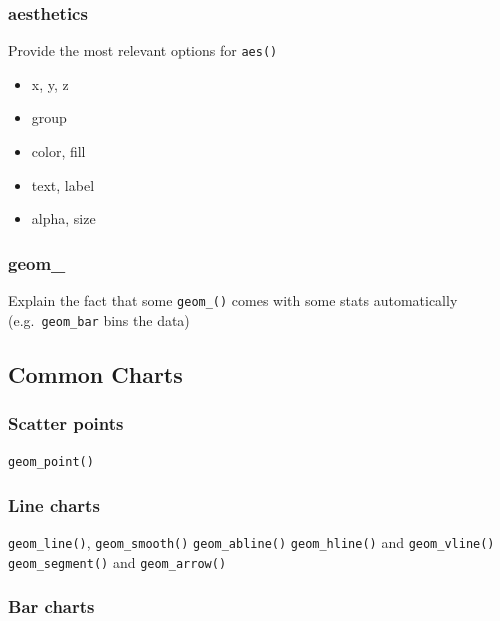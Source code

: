 \documentclass[
]{book}
\providecommand{\tightlist}{%
  \setlength{\itemsep}{0pt}\setlength{\parskip}{0pt}}
\begin{document}
\hypertarget{aesthetics}{%
\subsubsection{aesthetics}\label{aesthetics}}

Provide the most relevant options for \texttt{aes()}

\begin{itemize}
\tightlist
\item
  x, y, z
\item
  group
\item
  color, fill
\item
  text, label
\item
  alpha, size
\end{itemize}

\hypertarget{geom_}{%
\subsubsection{geom\_}\label{geom_}}

Explain the fact that some \texttt{geom\_()} comes with some stats automatically (e.g.~\texttt{geom\_bar} bins the data)

\hypertarget{common-charts}{%
\subsection{Common Charts}\label{common-charts}}

\hypertarget{scatter-points}{%
\subsubsection{Scatter points}\label{scatter-points}}

\texttt{geom\_point()}

\hypertarget{line-charts}{%
\subsubsection{Line charts}\label{line-charts}}

\texttt{geom\_line()}, \texttt{geom\_smooth()}
\texttt{geom\_abline()}
\texttt{geom\_hline()} and \texttt{geom\_vline()}
\texttt{geom\_segment()} and \texttt{geom\_arrow()}

\hypertarget{bar-charts}{%
\subsubsection{Bar charts}\label{bar-charts}}
\end{document}
